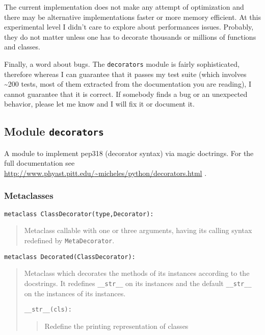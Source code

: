 \documentclass[11pt,english]{article}
\begin{document}
The current implementation does not make any attempt of optimization and
there may be alternative implementations faster or more memory efficient.
At this experimental level I didn't care to explore about performances 
issues. Probably, they do not  matter unless one has to decorate
thousands or millions of functions and classes.

Finally, a word about bugs. The \texttt{decorators} module is fairly sophisticated,
therefore whereas I can guarantee that it passes my test suite (which involves
{\~{ }}200 tests, most of them extracted from the documentation you are reading), 
I cannot guarantee that it is correct. If somebody finds a bug or an 
unexpected behavior, please let me know and I will fix it or document it.



\hypertarget{module-decorators}{}
\subsection*{Module \texttt{decorators}}

A module to implement pep318 (decorator syntax) via magic doctrings.
For the full documentation see
\href{http://www.phyast.pitt.edu/~micheles/python/decorators.html}{http://www.phyast.pitt.edu/{\~{ }}micheles/python/decorators.html} .



\hypertarget{id3}{}
\subsubsection*{Metaclasses}

\texttt{metaclass ClassDecorator(type,Decorator):}
\begin{quote}

Metaclass callable with one or three arguments, having its calling
syntax redefined by \texttt{MetaDecorator}.
\end{quote}

\texttt{metaclass Decorated(ClassDecorator):}
\begin{quote}

Metaclass which decorates the methods of its instances according
to the docstrings. It redefines \texttt{{\_}{\_}str{\_}{\_}} on
its instances and the default \texttt{{\_}{\_}str{\_}{\_}} on the instances of its
instances.

\texttt{{\_}{\_}str{\_}{\_}(cls):}
\begin{quote}

Redefine the printing representation of classes
\end{quote}
\end{quote}
\end{document}
